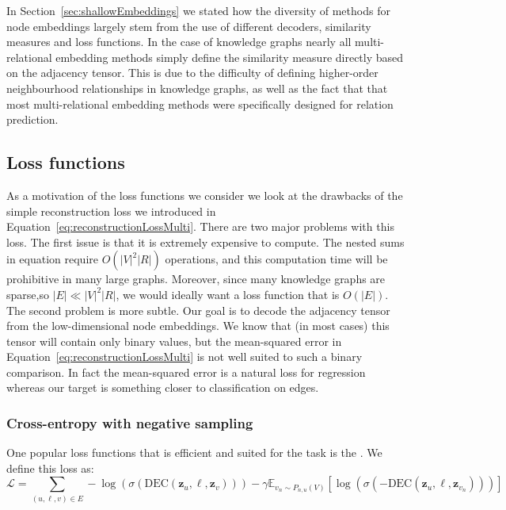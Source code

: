 \medskip
In Section~\ref{sec:shallowEmbeddings} we stated how the diversity of methods for node embeddings largely stem from the use of different decoders, similarity measures and loss functions. In the case of knowledge graphs nearly all multi-relational embedding methods simply define the similarity measure directly based on the adjacency tensor. This is due to the difficulty of defining higher-order neighbourhood relationships in knowledge graphs, as well as the fact that that most multi-relational embedding methods were specifically designed for relation prediction.

\subsection{Loss functions}
As a motivation of the loss functions we consider we look at the drawbacks of the simple reconstruction loss we introduced in Equation~\eqref{eq:reconstructionLossMulti}. There are two major problems with this loss. The first issue is that it is extremely expensive to compute. The nested sums in equation require $O(|V|^2|R|)$ operations, and this computation time will be prohibitive in many large graphs. Moreover, since many knowledge graphs are sparse,so $|E| \ll |V|^2|R|$, we would ideally want a loss function that is $O(|E|)$. The second problem is more subtle. Our goal is to decode the adjacency tensor from the low-dimensional node embeddings. We know that (in most cases) this tensor will contain only binary values, but the mean-squared error in Equation~\eqref{eq:reconstructionLossMulti} is not well suited to such a binary comparison. In fact the mean-squared error is a natural loss for regression whereas our target is something closer to classification on edges.

\subsubsection{Cross-entropy with negative sampling}
One popular loss functions that is efficient and suited for the task is the . We define this loss as:
\begin{equation*}
    \mathcal{L} = \sum_{(u,\ell,v)\in E} -\log(\sigma(\text{DEC}(\mathbf{z}_u, \ell, \mathbf{z}_v))) - \gamma\mathbb{E}_{v_n\sim P_{n,u}(V)}[\log(\sigma(-\text{DEC}(\mathbf{z}_u, \ell, \mathbf{z}_{v_n})))]
\end{equation*}

